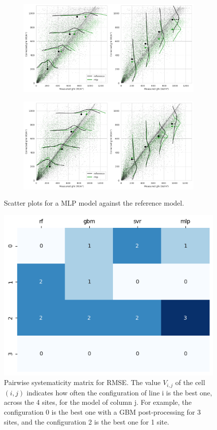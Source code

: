 \begin{figure}\ContinuedFloat
    \begin{subfigure}{\columnwidth}
        \includegraphics[width=\columnwidth]{figures/first_study/scatter_plot_mlp_site3_rmse.png}
    \end{subfigure}
\medskip
    \begin{subfigure}{\columnwidth}
        \includegraphics[width=\columnwidth]{figures/first_study/scatter_plot_mlp_site4_rmse.png}
    \end{subfigure}
    \caption[]{Scatter plots for a MLP model against the reference model.}
\end{figure}

\begin{figure}[htb!]
    \centering
    \includegraphics[width=0.6\columnwidth]{figures/first_study/comp_predictors_rmse.png}
\caption{Pairwise systematicity matrix for RMSE. The value $V_{i,j}$ of
 the cell $(i,j)$ indicates how often the configuration of line i is the best one, across 
 the 4 sites, for the model of column j. For example, the configuration 0 is the best one
 with a GBM post-processing for 3 sites, and the configuration 2 is the best one for 1 site.}
\end{figure}

